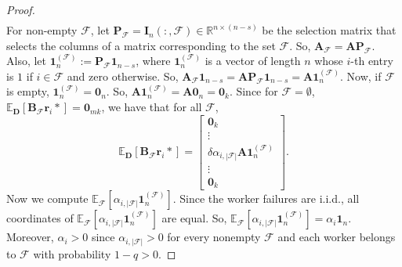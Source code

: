 \documentclass[journal,draftcls,onecolumn]{IEEEtran}
\theoremstyle{mystyle}
\newcommand{\bfD}{\mathbf{D}}
\newcommand{\bfA}{\mathbf{A}}
\newcommand{\bfB}{\mathbf{B}}
\newcommand{\bfP}{\mathbf{P}}
\newcommand{\cF}{\mathcal{F}}
\begin{document}
\begin{proof}
\begin{align*}
\end{align*}
For non-empty $\cF$, let $\mathbf{P}_{\mathcal{F}} = \mathbf{I}_n(:, \mathcal{F}) \in \mathbb{R}^{n \times (n-s)}$ be the selection matrix that selects the columns of a matrix corresponding to the set $\mathcal{F}$. So, $\mathbf{A}_{\cF} = \bfA \bfP_{\cF}$. 
Also, let $\mathbf{1}_{n}^{(\cF)} := \bfP_{\cF} \mathbf{1}_{n-s}$, where $\mathbf{1}_{n}^{(\cF)}$ is a vector of length $n$ whose $i$-th entry is $1$ if $i \in \cF$ and zero otherwise. So, $\bfA_{\cF} \mathbf{1}_{n-s} = \bfA \bfP_{\cF} \mathbf{1}_{n-s} = \bfA\mathbf{1}_{n}^{(\cF)}$. Now, if $\cF$ is empty, $\mathbf{1}_{n}^{(\cF)} = \mathbf{0}_n$. So, $\bfA\mathbf{1}_{n}^{(\cF)} = \bfA \mathbf{0}_n = \mathbf{0}_k$. Since for $\cF = \emptyset$, $\mathbb{E}_{\bfD}[\bfB_{\cF} \mathbf{r}_i*] = \mathbf{0}_{mk}$,  we have that for all $\cF$,  
\[ \mathbb{E}_{\bfD}[\mathbf{B}_{\cF}  \mathbf{r}_i*] = \begin{bmatrix} \mathbf{0}_k\\ \vdots \\ \delta \alpha_{i,|\cF|} \mathbf{A} \mathbf{1}_{n}^{(\cF)} \\ \vdots\\ \mathbf{0}_k \end{bmatrix}.\]
Now we compute $\mathbb{E}_{\cF} [\alpha_{i,|\cF|} \mathbf{1}_{n}^{(\cF)}]$. Since the worker failures are i.i.d., all coordinates of $\mathbb{E}_{\cF} [\alpha_{i,|\cF|} \mathbf{1}_{n}^{(\cF)}]$ are equal. So, $\mathbb{E}_{\cF} [\alpha_{i,|\cF|} \mathbf{1}_{n}^{(\cF)}] = \alpha_i \mathbf{1}_n$. Moreover, $\alpha_i>0$ since $\alpha_{i,|\mathcal{F}|}>0$ for every nonempty
$\mathcal{F}$ and each worker belongs to $\mathcal{F}$ with probability
$1-q>0$.

\end{proof}
\end{document}
